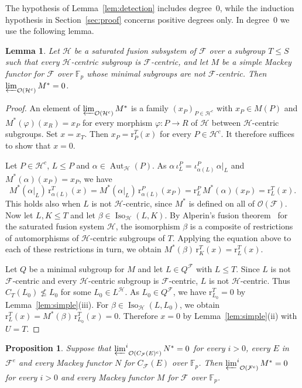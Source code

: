 \documentclass[10pt]{amsart}
\newtheorem{proposition}[theorem]{Proposition}
\newtheorem{lemma}[theorem]{Lemma}
\theoremstyle{definition}
\DeclareMathOperator{\Aut}{Aut}
\numberwithin{equation}{section}
\renewcommand{\le}{\leqslant}
\newcommand{\F}{\mathcal F}
\newcommand{\Hh}{\mathcal H}
\newcommand{\Op}{\mathcal O}
\newcommand{\Iso}{\operatorname{Iso}}
\newcommand{\limi}[2]{\mathop{\varprojlim\nolimits^{#1}}_{#2}}
\begin{document}
The hypothesis of Lemma~\ref{lem:detection} includes degree~$0$, while the induction hypothesis in Section~\ref{sec:proof} concerns positive degrees only. In degree~$0$ we use the following lemma.

\begin{lemma}\label{lem:degree-zero}
Let $\Hh$ be a saturated fusion subsystem of $\F$ over a subgroup $T\le S$ such that every $\Hh$-centric subgroup is $\F$-centric, and let $M$ be a simple Mackey functor for $\F$ over $\mathbb{F}_p$ whose minimal subgroups are not $\F$-centric. Then $\varprojlim_{\Op(\Hh^c)}M^*=0$.
\end{lemma}

\begin{proof}
An element of $\varprojlim_{\Op(\Hh^c)}M^*$ is a family $(x_P)_{P\in\Hh^c}$ with $x_P\in M(P)$ and $M^*(\varphi)(x_R)=x_P$ for every morphism $\varphi\colon P\to R$ of $\Hh$ between $\Hh$-centric subgroups. Set $x=x_T$. Then $x_P=\mathrm{r}^T_P(x)$ for every $P\in\Hh^c$. It therefore suffices to show that $x=0$.

Let $P\in\Hh^c$, $L\le P$ and $\alpha\in\Aut_\Hh(P)$. As $\alpha\,\iota^P_L=\iota^P_{\alpha(L)}\,\alpha|_L$ and $M^*(\alpha)(x_P)=x_P$, we have
\[
M^*(\alpha|_L)\,\mathrm{r}^T_{\alpha(L)}(x)=M^*(\alpha|_L)\,\mathrm{r}^P_{\alpha(L)}(x_P)=\mathrm{r}^P_L\,M^*(\alpha)(x_P)=\mathrm{r}^T_L(x).
\]
This holds also when $L$ is not $\Hh$-centric, since $M^*$ is defined on all of $\Op(\F)$. Now let $L,K\le T$ and let $\beta\in\Iso_\Hh(L,K)$. By Alperin's fusion theorem~\cite[Theorem~4.52]{Craven} for the saturated fusion system $\Hh$, the isomorphism $\beta$ is a composite of restrictions of automorphisms of $\Hh$-centric subgroups of $T$. Applying the equation above to each of these restrictions in turn, we obtain $M^*(\beta)\,\mathrm{r}^T_K(x)=\mathrm{r}^T_L(x)$.

Let $Q$ be a minimal subgroup for $M$ and let $L\in Q^\F$ with $L\le T$. Since $L$ is not $\F$-centric and every $\Hh$-centric subgroup is $\F$-centric, $L$ is not $\Hh$-centric. Thus $C_T(L_0)\not\le L_0$ for some $L_0\in L^\Hh$. As ${L_0\in Q^\F}$, we have $\mathrm{r}^T_{L_0}=0$ by Lemma~\ref{lem:simple}(iii). For $\beta\in\Iso_\Hh(L,L_0)$, we obtain ${\mathrm{r}^T_L(x)=M^*(\beta)\,\mathrm{r}^T_{L_0}(x)=0}$. Therefore $x=0$ by Lemma~\ref{lem:simple}(ii) with $U=T$.
\end{proof}

\begin{proposition}\label{prop:criterion}
Suppose that $\limi{i}{\Op(C_\F(E)^c)}N^*=0$ for every $i>0$, every $E$ in $\F^e$ and every Mackey functor $N$ for $C_\F(E)$ over $\mathbb{F}_p$. Then $\limi{i}{\Op(\F^c)}M^*=0$ for every $i>0$ and every Mackey functor $M$ for $\F$ over $\mathbb{F}_p$.
\end{proposition}
\end{document}
